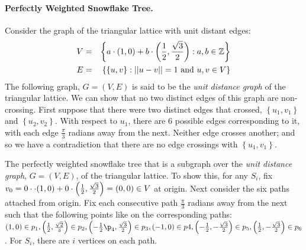 \paragraph{Perfectly Weighted Snowflake Tree.}

Consider the graph of the triangular lattice with unit distant edges:
\begin{eqnarray*}
V &=& \left\lbrace a\cdot (1,0) + b \cdot \left(\frac{1}{2},\frac{\sqrt{3}}{2}\right) : a,b \in {\mathbb{Z}} \right\rbrace\\
E &=& \left\lbrace \left\lbrace u,v \right\rbrace : \vert\vert u-v \vert\vert = 1 \text{ and } u,v \in V\right\rbrace
\end{eqnarray*}
The following graph, $G=(V,E)$ is said to be the \textit{unit distance graph} of the triangular lattice.  
We can show that no two distinct edges of this graph are non-crossing.  
First suppose that there were two distinct edges that crossed, $\left\lbrace u_1,v_1 \right\rbrace $ and $\left\lbrace u_2,v_2 \right\rbrace$.  
With respect to $u_1$, there are 6 possible edges corresponding to it, with each edge $\frac{\pi}{3}$ radians away from the next.  
Neither edge crosses another; and so we have a contradiction that there are no edge crossings with $\left\lbrace u_1,v_1 \right\rbrace $.  


The perfectly weighted snowflake tree that is a subgraph over the \textit{unit distance graph}, $G=(V,E)$, of the triangular lattice.  
To show this, for any $S_i$, fix $v_0 = 0 \cdot \cdot (1,0) + 0 \cdot \left(\frac{1}{2},\frac{\sqrt{3}}{2}\right)=\left( 0,0 \right) \in V$ at origin.  
Next consider the six paths attached from origin.  
Fix each consecutive path $\frac{\pi}{3}$ radians away from the next such that the following points like on the corresponding paths: $\lr{1,0} \in p_1, \lr{\frac{1}{2} ,\frac{\sqrt{2}}{3}} \in p_2,\lr{-\frac{1}{2}\p_4,\frac{\sqrt{3}}{2}} \in p_3, \lr{-1,0} \in p4, \lr{-\frac{1}{2},-\frac{\sqrt{3}}{2}}\in p_5,\lr{\frac{1}{2},-\frac{\sqrt{3}}{2}}\in p_6$.  
For $S_i$, there are $i$ vertices on each path.  


